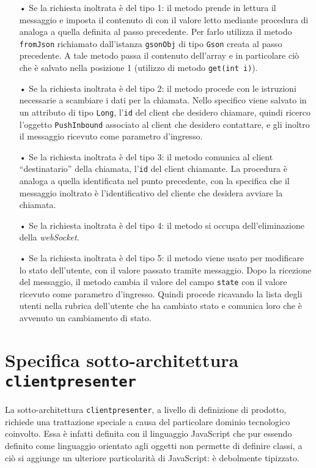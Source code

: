 \begin{description}
	\begin{itemize}
		\item[•]Se la richiesta inoltrata è del tipo 1: il metodo prende in lettura il messaggio e imposta il contenuto di  con il valore letto mediante procedura di  analoga a quella definita al passo precedente. Per farlo utilizza il metodo \texttt{fromJson} richiamato dall'istanza \texttt{gsonObj} di tipo \texttt{Gson} creata al passo precedente. A tale metodo passa il contenuto dell'array e in particolare ciò che è salvato nella posizione 1 (utilizzo di metodo \texttt{get(int i)}).
		\item[•]Se la richiesta inoltrata è del tipo 2: il metodo procede con le istruzioni necessarie a scambiare i dati per la chiamata. Nello specifico viene salvato in un attributo di tipo \texttt{Long}, l'\texttt{id} del client che desidero chiamare, quindi ricerco l'oggetto \texttt{PushInbound} associato al client che desidero contattare, e gli inoltro il messaggio ricevuto come parametro d'ingresso.
		\item[•]Se la richiesta inoltrata è del tipo 3: il metodo comunica al client ``destinatario'' della chiamata, l'\texttt{id} del client chiamante. La procedura è analoga a quella identificata nel punto precedente, con la specifica che il messaggio inoltrato è l'identificativo del cliente che desidera avviare la chiamata.
		\item[•]Se la richiesta inoltrata è del tipo 4: il metodo si occupa dell'eliminazione della \textit{webSocket}.
		\item[•]Se la richiesta inoltrata è del tipo 5: il metodo viene usato per modificare lo stato dell'utente, con il valore passato tramite messaggio. Dopo la ricezione del messaggio, il metodo cambia il valore del campo \texttt{state} con il valore ricevuto come parametro d'ingresso. Quindi procede ricavando la lista degli utenti nella rubrica dell'utente che ha cambiato stato e comunica loro che è avvenuto un cambiamento di stato.
	\end{itemize}
\end{description}

\clearpage

\section{Specifica sotto-architettura \texttt{clientpresenter}}\label{sec:clientpresenterarchitecture}

La sotto-architettura \texttt{clientpresenter}, a livello di definizione di prodotto, richiede una trattazione speciale a causa del particolare dominio tecnologico coinvolto. Essa è infatti definita con il linguaggio JavaScript che pur essendo definito come linguaggio orientato agli oggetti non permette di definire classi, a ciò si aggiunge un ulteriore particolarità di JavaScript: è debolmente tipizzato.

